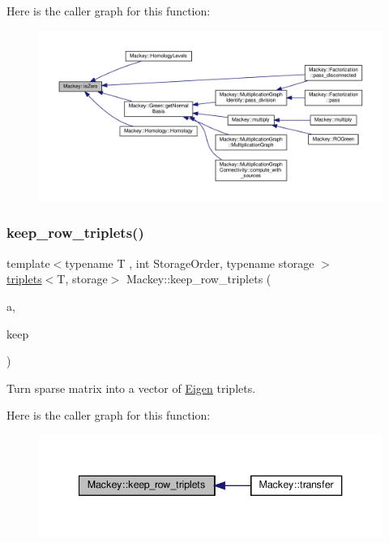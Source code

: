 Here is the caller graph for this function\+:\nopagebreak
\begin{figure}[H]
\begin{center}
\leavevmode
\includegraphics[width=350pt]{namespaceMackey_a4c3647777bc890a4649ae24b138bbb79_icgraph}
\end{center}
\end{figure}
\mbox{\label{namespaceMackey_a2c0a3d97e1d5617cf9b802d0cdcfebfc}} 
\subsubsection{\texorpdfstring{keep\+\_\+row\+\_\+triplets()}{keep\_row\_triplets()}}
{\footnotesize\ttfamily template$<$typename T , int Storage\+Order, typename storage $>$ \\
\hyperlink{namespaceMackey_a0b8cd52f81199d53fa1e93946d8115ef}{triplets}$<$T, storage$>$ Mackey\+::keep\+\_\+row\+\_\+triplets (\begin{DoxyParamCaption}\item[{const Eigen\+::\+Sparse\+Matrix$<$ T, Storage\+Order, storage $>$ \&}]{a,  }\item[{const std\+::vector$<$ storage $>$ \&}]{keep }\end{DoxyParamCaption})}



Turn sparse matrix into a vector of \hyperlink{namespaceEigen}{Eigen} triplets. 

Here is the caller graph for this function\+:\nopagebreak
\begin{figure}[H]
\begin{center}
\leavevmode
\includegraphics[width=340pt]{namespaceMackey_a2c0a3d97e1d5617cf9b802d0cdcfebfc_icgraph}
\end{center}
\end{figure}
\mbox{\label{namespaceMackey_a9a8496759bc7bb14dcaa2284ae1d0491}} 
